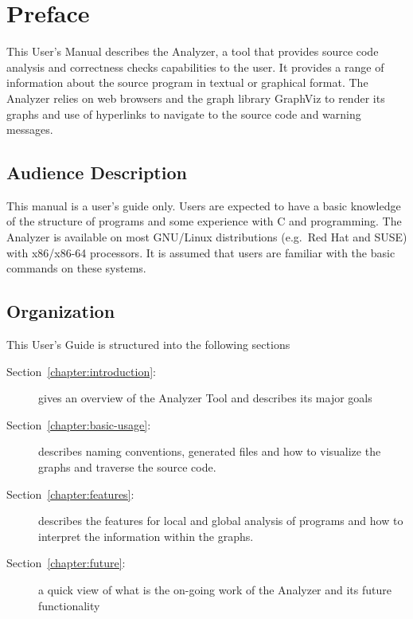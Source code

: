 





\tableofcontents
\listoffigures
\pagebreak

\section*{Preface}

This User's Manual describes the \openshmem Analyzer, a tool that
provides source code analysis and correctness checks capabilities to
the user. It provides a range of information about the source program
in textual or graphical format. The \openshmem Analyzer relies on web
browsers and the graph library GraphViz to render its graphs and use
of hyperlinks to navigate to the source code and warning messages.

\subsection*{Audience Description}

This manual is a user's guide only. Users are expected to have a basic
knowledge of the structure of programs and some experience with C and
\openshmem programming. The \openshmem Analyzer is available on most
GNU/Linux distributions (e.g.\ Red Hat and SUSE) with x86/x86-64
processors. It is assumed that users are familiar with the basic
commands on these systems.

\subsection*{Organization}

This User's Guide is structured into the following sections

\begin{description}
\item[Section~\ref{chapter:introduction}:~]
  gives an overview of the \openshmem Analyzer Tool and describes its
  major goals
\item[Section~\ref{chapter:basic-usage}:~]
  describes naming conventions, generated files and how to visualize
  the graphs and traverse the source code.
\item[Section~\ref{chapter:features}:~]
  describes the features for local and global analysis of \openshmem
  programs and how to interpret the information within the graphs.
\item [Section~\ref{chapter:future}:~] a quick
  view of what is the on-going work of the \openshmem Analyzer and its
  future functionality
\end{description}


